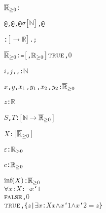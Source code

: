 \begin{alltt}
\({\pvssubscript{\overline{\mathbb{R}}}{{\geq}0}}\): 

   @, @, @\(\sigma\)\({\pvsbracketl}\)\(\mathbb{N}\)\({\pvsbracketr}\), @

  :  \({\pvsbracketl}\)\pvsid{(}\pvsid{)} \(\rightarrow\) \(\mathbb{R}\)\({\pvsbracketr}\) \pvskey{=} .;\vspace*{\pvsdeclspacing}

  \({\pvssubscript{\overline{\mathbb{R}}}{{\geq}0}}\):  = \({\pvsbracketl}\), \({\pvssubscript{\mathbb{R}}{{\geq}0}}\)\({\pvsbracketr}\)  \pvsid{(}\({\pvskey{TRUE}}\), \(0\)\pvsid{)}\vspace*{\pvsdeclspacing}

  \(i\), \(j\), , :  \(\mathbb{N}\)\vspace*{\pvsdeclspacing}

  \(x\), \(y\), \(x\sb{1}\), \(y\sb{1}\), \(x\sb{2}\), \(y\sb{2}\):  \({\pvssubscript{\overline{\mathbb{R}}}{{\geq}0}}\)\vspace*{\pvsdeclspacing}

  \(z\):  \(\mathbb{R}\)\vspace*{\pvsdeclspacing}

  \(S\), \(T\):  \({\pvsbracketl}\)\(\mathbb{N}\) \(\rightarrow\) \({\pvssubscript{\overline{\mathbb{R}}}{{\geq}0}}\)\({\pvsbracketr}\)\vspace*{\pvsdeclspacing}

  \(X\):  \({\pvsbracketl}\)\({\pvssubscript{\overline{\mathbb{R}}}{{\geq}0}}\)\({\pvsbracketr}\)\vspace*{\pvsdeclspacing}

  \(\varepsilon\):  \({\pvssubscript{\mathbb{R}}{{>}0}}\)\vspace*{\pvsdeclspacing}

  \(c\):  \({\pvssubscript{\mathbb{R}}{{\geq}0}}\)\vspace*{\pvsdeclspacing}

  \(\xunderscoreinfonefn{X}\): \({\pvssubscript{\overline{\mathbb{R}}}{{\geq}0}}\) \pvskey{=}
       \pvsid{(}\(\forall\) \pvsid{(}\(x\): \pvsid{(}\(X\)\pvsid{)}\pvsid{)}: \(\neg\) \(x\)`\(1\)\pvsid{)}
         \pvsid{(}\({\pvskey{FALSE}}\), \(0\)\pvsid{)}
       \pvsid{(}\({\pvskey{TRUE}}\), \pvsid{(}\{\(z\) | \(\exists\) \(x\): \(X\)\pvsid{(}\(x\)\pvsid{)} \(\wedge\) \(x\)`\(1\) \(\wedge\) \(x\)`\(2\) \(=\) \(z\)\}\pvsid{)}\pvsid{)}
      \vspace*{\pvsdeclspacing}


\end{alltt}
